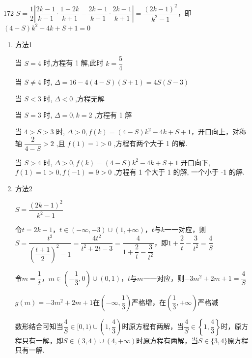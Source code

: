\begin{enumerate}
\begin{jieda}
\begin{enumerate}
\begin{dingautolist}{172}
                $S = \dfrac{1}{2} \left|\dfrac{{2k} - 1}{k - 1} \cdot \dfrac{1 - {2k}}{k + 1} - \dfrac{{2k} - 1}{k - 1} \cdot \dfrac{{2k} - 1}{k + 1}\right| = \dfrac{{\left( 2k - 1\right) }^{2}}{{k}^{2} - 1}$，即 $\left( {4 - S}\right) {k}^{2} - {4k} + S + 1 = 0$
                \begin{enumerate}[1.]
                    \item 方法1 
                    
                    当 $S = 4$ 时,方程有 1 解,此时 $k = \dfrac{5}{4}$
                    
                    当 $S \neq  4$ 时, $\Delta  = {16} - 4\left( {4 - S}\right) \left( {S + 1}\right)  = {4S}\left( {S - 3}\right)$ 
                    
                    当 $S < 3$ 时, $\Delta  < 0$ ,方程无解
                    
                    当 $S = 3$ 时, $\Delta  = 0,k = 2$ ,方程有 1 解
                    
                    当 $4 > S > 3$ 时, $\Delta  > 0,f\left( k\right)  = \left( {4 - S}\right) {k}^{2} - {4k} + S + 1$，开口向上，对称轴 $\dfrac{2}{4 - S} > 2$ ,且 $f\left( 1\right)  = 1 > 0$ ,方程有两个大于 1 的解.
                    
                    当 $S > 4$ 时, $\Delta  > 0,f\left( k\right)  = \left( {4 - S}\right) {k}^{2} - {4k} + S + 1$ 开口向下, $f\left( 1\right)  = 1 > 0,f\left( {-1}\right)  = 9 > 0$ ,方程有 1 个大于 1 的解, 一个小于 -1 的解.
                    \item 方法2

                    $S = \dfrac{(2k-1)^2}{k^2-1}$
                    
                    令$t = 2k-1$，$t \in (-\infty, -3) \cup (1, +\infty)$，$t$与$k$一一对应，则$S = \dfrac{t^2}{\left(\dfrac{t+1}{2}\right)^2-1} = \dfrac{4t^2}{t^2+2t-3} = \dfrac{4}{1+\dfrac{2}{t}-\dfrac{3}{t^2}}$，即$1+\dfrac{2}{t}-\dfrac{3}{t^2} = \dfrac{4}{S}$

                    令$m = \dfrac{1}{t}$，$m \in \left(-\dfrac{1}{3}, 0\right) \cup (0, 1)$，$t$与$m$一一对应，则$-3m^2+2m+1 = \dfrac{4}{S}$
                    
                    $g(m) = -3m^2+2m+1$在$\left(-\infty, \dfrac{1}{3}\right)$严格增，在$\left(\dfrac{1}{3}, +\infty\right)$严格减
                    
                    数形结合可知当$\dfrac{4}{S} \in [0, 1)\cup \left(1, \dfrac{4}{3}\right)$时原方程有两解，当$\dfrac{4}{S} \in \left\{1, \dfrac{4}{3}\right\}$时，原方程只有一解，即$S \in (3, 4) \cup (4, +\infty)$时原方程有两解，当$S \in \{3,4\}$原方程只有一解.
                \end{enumerate}
            \end{dingautolist}


\end{enumerate}
\end{jieda}
\end{enumerate}
